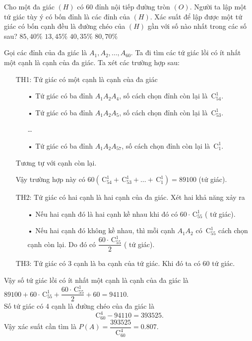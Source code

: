 \begin{ex}%
	Cho một đa giác $(H)$ có $60$ đỉnh nội tiếp đường tròn $(O)$. Người ta lập một tứ giác tùy ý có bốn đỉnh  là các đỉnh của $(H)$. Xác suất để lập được một tứ giác có bốn cạnh đều là đường chéo của $(H)$ gần với số nào nhất trong các số sau?
	\choice
	{$85{,}40\%$}
	{$13{,}45\%$}
	{$40{,}35\%$}
	{\True $80{,}70\%$}
	\loigiai
	{Gọi các đỉnh của đa giác là $A_1, A_2, \dots , A_{60}$. 
		Ta đi tìm các tứ giác lồi có ít nhất một cạnh là cạnh của đa giác. Ta xét các trường hợp sau:
		\begin{enumerate}
			\item[TH1:] Tứ giác có một cạnh là cạnh của đa giác
			\begin{enumerate}
				\item[•] Tứ giác có ba đỉnh $A_1A_2 A_4$, số cách chọn đỉnh còn lại là $\mathrm{\,C}_{54}^1$.
				\item[•] Tứ giác có ba đỉnh $A_1A_2 A_5$, số cách chọn đỉnh còn lại là $\mathrm{\,C}_{53}^1$.
				
				\dots
				
				\item[•] Tứ giác có ba đỉnh $A_1A_2 A_{57}$, số cách chọn đỉnh còn lại là $\mathrm{\,C}_{1}^1$.
			\end{enumerate}
			Tương tự với cạnh còn lại.
			
			Vậy trường hợp này có $60\left (\mathrm{\,C}_{54}^1+\mathrm{\,C}_{53}^1+\dots +\mathrm{\,C}_{1}^1\right ) =89100$ (tứ giác).
			\item[TH2:]Tứ giác có hai cạnh là hai cạnh của đa giác. Xét hai khả năng xảy ra
			\begin{enumerate}
				\item[•] Nếu hai cạnh đó là hai cạnh kề nhau khi đó có $60\cdot\mathrm{\,C}_{55}^1$ ( tứ giác).
				\item[•] Nếu hai cạnh đó không kề nhau, thì mỗi cạnh $A_1A_2$  có $\mathrm{\,C}_{55}^1$ cách chọn cạnh còn lại. Do đó có $\dfrac{60\cdot\mathrm{\,C}_{55}^1}{2}$ ( tứ giác). 
			\end{enumerate}
			\item[TH3:] Tứ giác có 3 cạnh là ba cạnh của tứ giác. Khi đó ta có $60$ tứ giác.
		\end{enumerate}		
		Vậy số tứ giác lồi có ít nhất một cạnh là cạnh của đa giác là $89100+60\cdot\mathrm{\,C}_{55}^1+\dfrac{60\cdot\mathrm{\,C}_{55}^1}{2}+60 =94110. $\\		
		Số tứ giác có 4 cạnh là đường chéo của đa giác là $$\mathrm{\,C}_{60}^4-94110=393525.$$		
		Vậy xác suất cần tìm là $P(A)=\dfrac{393525}{\mathrm{C}_{60}^4}=0.807$.		
	}
\end{ex}%
